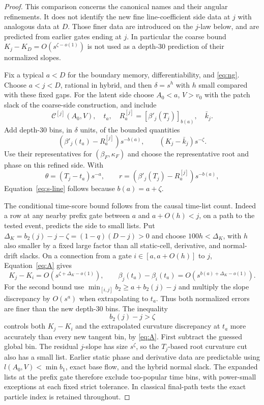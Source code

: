 \begin{proof}
This comparison concerns the canonical names and their angular
refinements.  It does not identify the new fine line-coefficient
side data at $j$ with analogous data at $D$.  Those finer data
are introduced on the $j$-law below, and are predicted from
earlier gates ending at $j$.  In particular the coarse bound
$K_j-K_D=O(s^{\zeta-o(1)})$ is not used as a depth-$30$
prediction of their normalized slopes.

Fix a typical $a<D$ for the boundary memory, differentiability,
and \eqref{eq:ng}.  Choose $a<j<D$, rational in hybrid, and then
$\delta=s^h$ with $h$ small compared with these fixed gaps.
For the latent side choose $A_0<a$, $V>v_0$ with the patch slack
of the coarse-side construction, and include
\[
 \mathcal C^{[j]}(A_0,V),\quad t_a,\quad
 R_a^{[j]}=[\beta'_j(T_j)]_{b(a)},\quad \bar k_j.
\]
Add depth-$30$ bins, in $\delta$ units, of the bounded quantities
\[
 (\beta'_j(t_a)-R_a^{[j]})s^{-b(a)},\qquad
 (K_j-\bar k_j)s^{-\zeta}.
\]
Use their representatives for $(\beta_F,\kappa_F)$ and choose the
representative root and phase on this refined side.  With
\[
 \theta=(T_j-t_a)s^{-a},\qquad
 r=(\beta'_j(T_j)-R_a^{[j]})s^{-b(a)},
\]
Equation~\eqref{eq:s-line} follows because $b(a)=a+\zeta$.

The conditional time-score bound follows from the causal time-list
count.  Indeed a row at any nearby prefix gate between $a$ and
$a+O(h)<j$, on a path to the tested event, predicts the side to
small lists.  Put $\Delta_K=b_2(j)-j-\zeta=(1-q)(D-j)>0$
and choose $100h<\Delta_K$, with $h$ also smaller by a fixed
large factor than all static-cell, derivative, and normal-drift
slacks.  On a connection from a gate $i\in[a,a+O(h)]$ to $j$,
Equation~\eqref{eq:A} gives
\[
 K_j-K_i=O(s^{\zeta+\Delta_K-o(1)}),\qquad
 \beta_j(t_a)-\beta_i(t_a)
   =O(s^{b(a)+\Delta_K-o(1)}).
\]
For the second bound use
$\min_{[i,j]}b_2\ge a+b_2(j)-j$ and multiply the slope
discrepancy by $O(s^a)$ when extrapolating to $t_a$.
Thus both normalized errors are finer than the new depth-$30$
bins.  The inequality
\[
 b_2(j)-j>\zeta
\]
controls both $K_j-K_i$ and the extrapolated curvature discrepancy
at $t_a$ more accurately than every new tangent bin, by
\eqref{eq:A}.  First subtract the guessed global bin.  The
residual $j$-slope has size $s^\zeta$, so the $T_j$-based root
curvature cut also has a small list.  Earlier static phase and
derivative data are predictable using
$l(A_0,V)<\min b_1$, exact base flow, and the hybrid normal slack.
The expanded lists at the prefix gate therefore exclude too-popular
time bins, with power-small exceptions at each fixed strict
tolerance.  In classical final-path tests the exact particle index
is retained throughout.


\end{proof}
